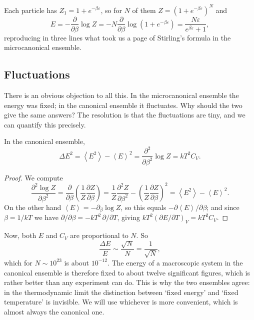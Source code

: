 \documentclass[a4paper]{scrartcl}
\newcommand{\avg}[1]{\left\langle #1 \right\rangle}
\begin{document}
\begin{example}
	Each particle has $Z_1 = 1 + e^{-\beta \varepsilon}$, so for $N$ of them $Z = (1+e^{-\beta\varepsilon})^N$ and
	$$
	E = -\frac{\partial}{\partial\beta} \log Z = -N \frac{\partial}{\partial \beta}\log(1+e^{-\beta\varepsilon}) = \frac{N\varepsilon}{e^{\beta\varepsilon}+1},
	$$
	reproducing in three lines what took us a page of Stirling's formula in the microcanonical ensemble.
\end{example}

\subsection{Fluctuations}

There is an obvious objection to all this. In the microcanonical ensemble the energy was fixed; in the canonical ensemble it fluctuates. Why should the two give the same answers? The resolution is that the fluctuations are tiny, and we can quantify this precisely.

\begin{proposition}
	In the canonical ensemble,
	$$
	\Delta E^2 = \avg{E^2} - \avg E^2 = \frac{\partial^2}{\partial\beta^2}\log Z = k T^2 C_V.
	$$
\end{proposition}
\begin{proof}
	We compute
	$$
	\frac{\partial^2 \log Z}{\partial \beta^2} = \frac{\partial}{\partial\beta}\left(\frac{1}{Z}\frac{\partial Z}{\partial\beta}\right) = \frac{1}{Z}\frac{\partial^2 Z}{\partial \beta^2} - \left(\frac 1Z \frac{\partial Z}{\partial \beta}\right)^2 = \avg{E^2} - \avg E^2.
	$$
	On the other hand $\avg E = -\partial_\beta \log Z$, so this equals $-\partial \avg E/\partial\beta$; and since $\beta = 1/kT$ we have $\partial/\partial\beta = -kT^2\, \partial/\partial T$, giving $kT^2 (\partial E/\partial T)_V = kT^2 C_V$.
\end{proof}

Now, both $E$ and $C_V$ are proportional to $N$. So
$$
\frac{\Delta E}{E} \sim \frac{\sqrt N}{N} = \frac{1}{\sqrt N},
$$
which for $N \sim 10^{23}$ is about $10^{-12}$. The energy of a macroscopic system in the canonical ensemble is therefore fixed to about twelve significant figures, which is rather better than any experiment can do. This is why the two ensembles agree: in the thermodynamic limit the distinction between `fixed energy' and `fixed temperature' is invisible. We will use whichever is more convenient, which is almost always the canonical one.
\end{document}
